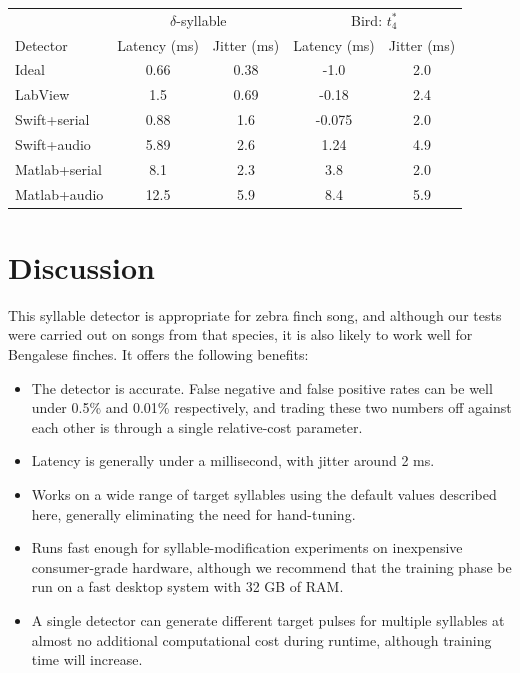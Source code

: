 \documentclass[10pt,letterpaper]{article}
\begin{document}
\vspace{8pt}
\begin{tabular}{l|c|c|c| c}
  & \multicolumn{2}{c}{$\delta$-syllable} & \multicolumn{2}{c}{Bird: $t^*_4$} \\
  Detector & Latency (ms) & Jitter (ms) & Latency (ms) & Jitter (ms) \\
  \hline
  Ideal & 0.66 & 0.38 & -1.0 & 2.0 \\
  LabView & 1.5 & 0.69 & -0.18 & 2.4 \\
  Swift+serial & 0.88 & 1.6 & -0.075 & 2.0 \\
  Swift+audio & 5.89 & 2.6 & 1.24 & 4.9 \\
  Matlab+serial & 8.1 & 2.3 & 3.8 & 2.0 \\
  Matlab+audio & 12.5 & 5.9 & 8.4 & 5.9
\end{tabular}

\vspace{8pt}

\section{Discussion}
\label{sec:conclusion}

This syllable detector is appropriate for zebra finch song, and although our tests were carried out on songs from that species, it is also likely to work well for Bengalese finches.  It offers the following benefits:
\begin{itemize}
\item The detector is accurate. False negative and
  false positive rates can be well under 0.5\% and 0.01\% respectively, and trading these two numbers off against each other is through a single relative-cost parameter.
\item Latency is generally under a millisecond, with jitter around 2 ms.
\item Works on a wide range of target syllables using the default values described here, generally eliminating the need for hand-tuning.
\item Runs fast enough for syllable-modification experiments on inexpensive consumer-grade hardware, although we recommend that the training phase be run on a fast desktop system with 32 GB of RAM.
\item A single detector can generate different target pulses for multiple syllables at almost no additional computational cost during runtime, although training time will increase.
\end{itemize}
\end{document}
